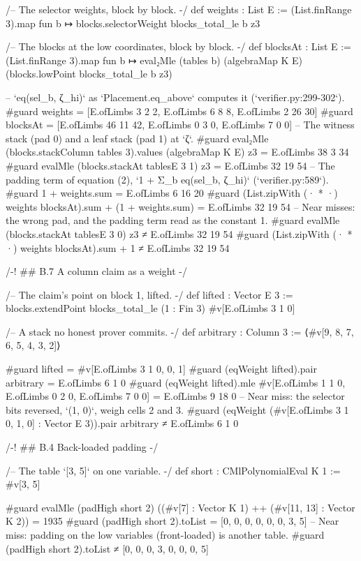 \begin{leancode}
/-- The selector weights, block by block. -/
def weights : List E := (List.finRange 3).map fun b ↦ blocks.selectorWeight blocks_total_le b z3

/-- The blocks at the low coordinates, block by block. -/
def blocksAt : List E := (List.finRange 3).map fun b ↦
  eval₂Mle (tables b) (algebraMap K E) (blocks.lowPoint blocks_total_le b z3)

-- `eq(sel_b, ζ_hi)` as `Placement.eq_above` computes it (`verifier.py:299-302`).
#guard weights = [E.ofLimbs 3 2 2, E.ofLimbs 6 8 8, E.ofLimbs 2 26 30]
#guard blocksAt = [E.ofLimbs 46 11 42, E.ofLimbs 0 3 0, E.ofLimbs 7 0 0]
-- The witness stack (pad 0) and a leaf stack (pad 1) at `ζ`.
#guard eval₂Mle (blocks.stackColumn tables 3).values (algebraMap K E) z3 = E.ofLimbs 38 3 34
#guard evalMle (blocks.stackAt tablesE 3 1) z3 = E.ofLimbs 32 19 54
-- The padding term of equation (2), `1 + Σ_b eq(sel_b, ζ_hi)` (`verifier.py:589`).
#guard 1 + weights.sum = E.ofLimbs 6 16 20
#guard (List.zipWith (· * ·) weights blocksAt).sum + (1 + weights.sum) = E.ofLimbs 32 19 54
-- Near misses: the wrong pad, and the padding term read as the constant 1.
#guard evalMle (blocks.stackAt tablesE 3 0) z3 ≠ E.ofLimbs 32 19 54
#guard (List.zipWith (· * ·) weights blocksAt).sum + 1 ≠ E.ofLimbs 32 19 54

/-! ## B.7 A column claim as a weight -/

/-- The claim's point on block 1, lifted. -/
def lifted : Vector E 3 := blocks.extendPoint blocks_total_le (1 : Fin 3) #v[E.ofLimbs 3 1 0]

/-- A stack no honest prover commits. -/
def arbitrary : Column 3 := ⟨#v[9, 8, 7, 6, 5, 4, 3, 2]⟩

#guard lifted = #v[E.ofLimbs 3 1 0, 0, 1]
#guard (eqWeight lifted).pair arbitrary = E.ofLimbs 6 1 0
#guard (eqWeight lifted).mle #v[E.ofLimbs 1 1 0, E.ofLimbs 0 2 0, E.ofLimbs 7 0 0] =
  E.ofLimbs 9 18 0
-- Near miss: the selector bits reversed, `(1, 0)`, weigh cells 2 and 3.
#guard (eqWeight (#v[E.ofLimbs 3 1 0, 1, 0] : Vector E 3)).pair arbitrary ≠ E.ofLimbs 6 1 0

/-! ## B.4 Back-loaded padding -/

/-- The table `[3, 5]` on one variable. -/
def short : CMlPolynomialEval K 1 := #v[3, 5]

#guard evalMle (padHigh short 2) ((#v[7] : Vector K 1) ++ (#v[11, 13] : Vector K 2)) = 1935
#guard (padHigh short 2).toList = [0, 0, 0, 0, 0, 0, 3, 5]
-- Near miss: padding on the low variables (front-loaded) is another table.
#guard (padHigh short 2).toList ≠ [0, 0, 0, 3, 0, 0, 0, 5]


\end{leancode}
